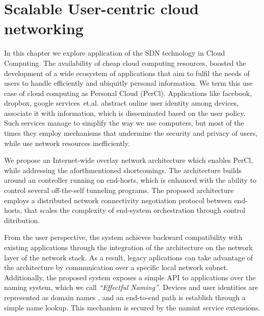 \chapter{Scalable User-centric cloud networking}
\ifpdf
    \graphicspath{{Chapter3/Chapter3Figs/PNG/}{Chapter3/Chapter3Figs/PDF/}{Chapter3/Chapter3Figs/}}
\else
    \graphicspath{{Chapter3/Chapter3Figs/EPS/}{Chapter3/Chapter3Figs/}}
\fi

In this chapter we explore application of the SDN technology in Cloud Computing.
The availability of cheap cloud computing resources, boosted the development of
a wide ecosystem of applications that aim to fulfil the needs of users to handle
efficiently and ubiquitly personal information.  We term this use case of cloud
computing as Personal Cloud (PerCl). Applications like facebook,
dropbox, google services~et.al.  abstract online user identity among devices,
associate it with information, which is disseminated based on the user policy.
Such services manage to simplify the way we use computers, but most of the times
they employ mechanisms that undermine the security and privacy of users, while
use network resources inefficiently. 

We propose an Internet-wide overlay network architecture which enables PerCl, while
addressing the aforthmentioned shortcomings. The architecture builds around an
\of controller running on end-hosts, which is enhanced with the ability to
control several off-the-self tunneling programs. The proposed architecture employs
a distributed network connectivity negotiation protocol between end-hosts, that
scales the complexity of end-system orchestration through control ditribution.

From the user perspective, the system achieves backward compatibility with
existing applications through the integration of the  architecture on the
network layer of the network stack. As a result, legacy aplications can take
advantage of the architecture by communication over a specific local
network subnet. Additionally, the proposed system exposes a simple API to
applications over the naming system, which we call {\it ``Effectful Naming''}.
Devices and user identities are represented as domain names , and an end-to-end 
path is establish through a simple name lookup. This mechanism is secured by the 
\dnssec namint service extensions. 


